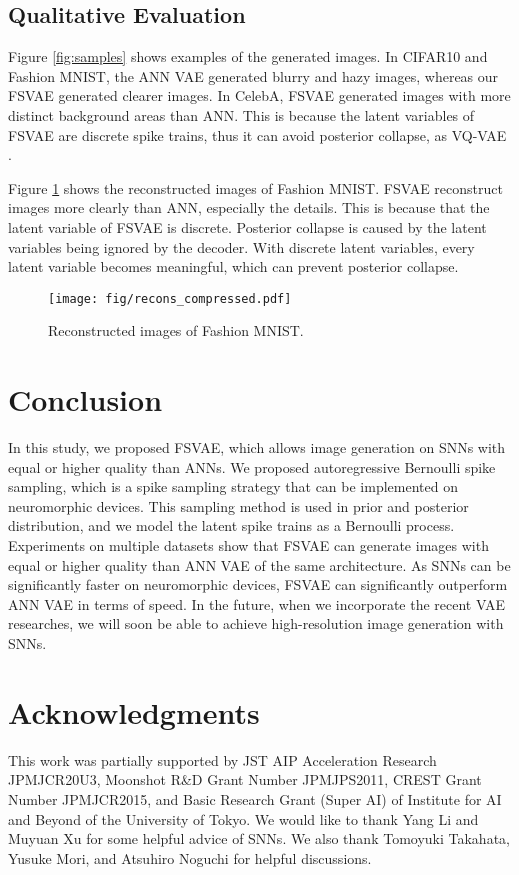 \documentclass[letterpaper]{article} %
\begin{document}
\subsection{Qualitative Evaluation}
Figure \ref{fig:samples} shows examples of the generated images. In CIFAR10 and Fashion MNIST, the ANN VAE generated blurry and hazy images, whereas our FSVAE generated clearer images. In CelebA, FSVAE generated images with more distinct background areas than ANN. This is because the latent variables of FSVAE are discrete spike trains, thus it can avoid posterior collapse, as VQ-VAE \cite{vqvae}.

Figure \ref{fig:recons} shows the reconstructed images of Fashion MNIST. FSVAE reconstruct images more clearly than ANN, especially the details. This is because that the latent variable of FSVAE is discrete. Posterior collapse is caused by the latent variables being ignored by the decoder. With discrete latent variables, every latent variable becomes meaningful, which can prevent posterior collapse.
\begin{figure}[t]
    \centering
    \texttt{[image: fig/recons\_compressed.pdf]} 
    \caption{Reconstructed images of Fashion MNIST.}
    \label{fig:recons}
\end{figure}



\section{Conclusion}
In this study, we proposed FSVAE, which allows image generation on SNNs with equal or higher quality than ANNs. We proposed autoregressive Bernoulli spike sampling, which is a spike sampling strategy that can be implemented on neuromorphic devices. This sampling method is used in prior and posterior distribution, and we model the latent spike trains as a Bernoulli process. Experiments on multiple datasets show that FSVAE can generate images with equal or higher quality than ANN VAE of the same architecture. As SNNs can be significantly faster on neuromorphic devices, FSVAE can significantly outperform ANN VAE in terms of speed. In the future, when we incorporate the recent VAE researches, we will soon be able to achieve high-resolution image generation with SNNs.

\section{Acknowledgments}
This work was partially supported by JST AIP Acceleration Research JPMJCR20U3, Moonshot R\&D Grant Number JPMJPS2011, CREST Grant Number JPMJCR2015, and Basic Research Grant (Super AI) of Institute for AI and Beyond of the University of Tokyo. We would like to thank Yang Li and Muyuan Xu for some helpful advice of SNNs. We also thank Tomoyuki Takahata, Yusuke Mori, and Atsuhiro Noguchi for helpful discussions.
\end{document}
